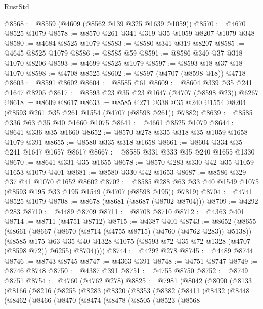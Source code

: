 \begin{lexlean}{RustStd}
\begin{coremodule}
{\begin{coremodule}
{{{{{{{{{{{{{{{{{{{{{{{{{{{{{{{{{{{@8568 := @8559 (@4609 (@8562 @139 @325 @1639 @1059))
@8570 := @4670 @8525 @1079
@8578 := @8570 @261 @341 @319 @35 @1059 @8207 @1079 @348
@8580 := @4684 @8525 @1079
@8583 := @8580 @341 @319 @8207
@8585 := @4645 @8525 @1079
@8586 := @8585 @59
@8591 := @8586 @340 @37 @318 @1070 @8206
@8593 := @4699 @8525 @1079
@8597 := @8593 @18 @37 @18 @1070
@8598 := @4708 @8525
@8602 := @8597 (@4707 (@8598 @18)) @4718
@8603 := @8591 @8602
@8604 := @8585 @61
@8609 := @8604 @339 @35 @241 @1647 @8205
@8617 := @8593 @23 @35 @23 @1647 (@4707 (@8598 @23)) @6267
@8618 := @8609 @8617
@8633 := @8585 @271 @338 @35 @240 @1554 @8204 (@8593 @261 @35 @261 @1554 (@4707 (@8598 @261)) @7882)
@8639 := @8585 @336 @63 @35 @40 @1660 @1075
@8641 := @4661 @8525 @1079
@8644 := @8641 @336 @35 @1660
@8652 := @8570 @278 @335 @318 @35 @1059 @1658 @1079 @391
@8655 := @8580 @335 @318 @1658
@8661 := @8604 @334 @35 @241 @1647 @1657 @8617
@8667 := @8585 @331 @333 @35 @240 @1655 @1330
@8670 := @8641 @331 @35 @1655
@8678 := @8570 @283 @330 @42 @35 @1059 @1653 @1079 @401
@8681 := @8580 @330 @42 @1653
@8687 := @8586 @329 @37 @41 @1070 @1652 @8602
@8702 := @8585 @288 @63 @33 @40 @1549 @1075 (@8593 @195 @33 @195 @1549 (@4707 (@8598 @195)) @7819)
@8704 := @4741 @8525 @1079
@8708 := @8678 (@8681 (@8687 (@8702 @8704)))
@8709 := @4292 @283
@8710 := @4489 @8709
@8711 := @8708 @8710
@8712 := @4363 @401
@8714 := @8711 (@4751 @8712)
@8715 := @4387 @401
@8743 := @8652
    (@8655
      (@8661
        (@8667
          (@8670 (@8714 (@4755 @8715) (@4760 (@4762 @283)) @5138))
          (@8585
            @175
            @63
            @35
            @40
            @1328
            @1075
            (@8593 @72 @35 @72 @1328 (@4707 (@8598 @72)) @6255)
            @8704))))
@8744 := @4292 @278
@8745 := @4489 @8744
@8746 := @8743 @8745
@8747 := @4363 @391
@8748 := @4751 @8747
@8749 := @8746 @8748
@8750 := @4387 @391
@8751 := @4755 @8750
@8752 := @8749 @8751
@8754 := @4760 (@4762 @278)
@8825 := @7981
    (@8042
      (@8090
        (@8133
          (@8166
            (@8216
              (@8255
                (@8283
                  (@8320
                    (@8353
                      (@8382
                        (@8411
                          (@8432
                            (@8448
                              (@8462
                                (@8466
                                  (@8470
                                    (@8474
                                      (@8478
                                        (@8505
                                          (@8523
                                            (@8568
}}}}}}}}}}}}}}}}}}}}}}}}}}}}}}}}}}}
\end{coremodule}}
\end{coremodule}
\end{lexlean}
